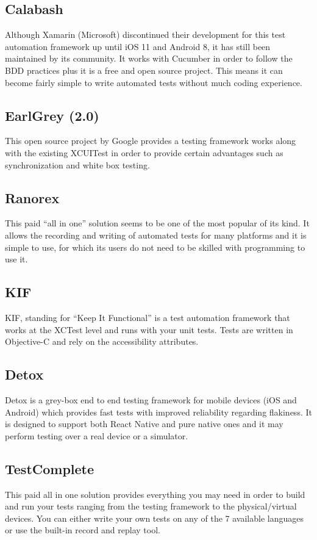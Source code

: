 \subsection {Calabash}
Although Xamarin (Microsoft) discontinued their development for this test automation framework up until iOS 11 and Android 8, it has still been maintained by its community. It works with Cucumber in order to follow the BDD practices plus it is a free and open source project. This means it can become fairly simple to write automated tests without much coding experience. \cite{Calabash}

\subsection {EarlGrey (2.0)}
This open source project by Google provides a testing framework works along with the existing XCUITest in order to provide certain advantages such as synchronization and white box testing. \cite{EarlGrey}
	
\subsection {Ranorex}
This paid “all in one” solution seems to be one of the most popular of its kind. It allows the recording and writing of automated tests for many platforms and it is simple to use, for which its users do not need to be skilled with programming to use it. \cite{Ranorex}

\subsection {KIF}
KIF, standing for “Keep It Functional” is a test automation framework that works at the XCTest level and runs with your unit tests. Tests are written in Objective-C and rely on the accessibility attributes. \cite{KIF}

\subsection {Detox}
Detox is a grey-box end to end testing framework for mobile devices (iOS and Android) which provides fast tests with improved reliability regarding flakiness. It is designed to support both React Native and pure native ones and it may perform testing over a real device or a simulator. \cite{Detox}

\subsection {TestComplete}
This paid all in one solution provides everything you may need in order to build and run your tests ranging from the testing framework to the physical/virtual devices. You can either write your own tests on any of the 7 available languages or use the built-in record and replay tool. \cite{TestComplete}

